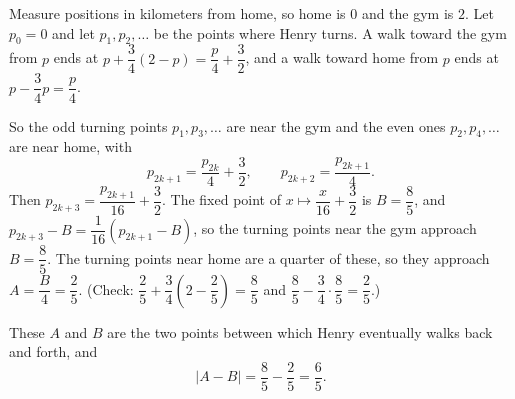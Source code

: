 Measure positions in kilometers from home, so home is $0$ and the gym is $2$. Let $p_0=0$ and let $p_1,p_2,\dots$ be the points where Henry turns. A walk toward the gym from $p$ ends at $p+\dfrac{3}{4}(2-p)=\dfrac{p}{4}+\dfrac{3}{2}$, and a walk toward home from $p$ ends at $p-\dfrac{3}{4}p=\dfrac {p}{4}$.

So the odd turning points $p_1,p_3,\dots$ are near the gym and the even ones $p_2,p_4,\dots$ are near home, with
\[
p_{2k+1}=\dfrac{p_{2k}}{4}+\dfrac{3}{2},\qquad p_{2k+2}=\dfrac{p_{2k+1}}{4}.
\]
Then $p_{2k+3}=\dfrac{p_{2k+1}}{16}+\dfrac{3}{2}$. The fixed point of $x\mapsto\dfrac{x}{16}+\dfrac{3}{2}$ is $B=\dfrac{8}{5}$, and $p_{2k+3}-B=\dfrac{1}{16}(p_{2k+1}-B)$, so the turning points near the gym approach $B=\dfrac{8}{5}$. The turning points near home are a quarter of these, so they approach $A=\dfrac {B}{4}=\dfrac{2}{5}$. (Check: $\dfrac{2}{5}+\dfrac{3}{4}\left(2-\dfrac{2}{5}\right)=\dfrac{8}{5}$ and $\dfrac{8}{5}-\dfrac{3}{4}\cdot\dfrac{8}{5}=\dfrac{2}{5}$.)

These $A$ and $B$ are the two points between which Henry eventually walks back and forth, and
\[
|A-B|=\dfrac{8}{5}-\dfrac{2}{5}=\boxed{\dfrac{6}{5}}.
\]

